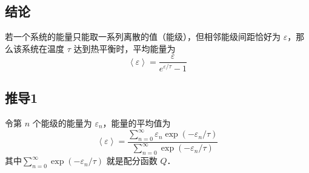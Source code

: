 

\subsection{结论}
若一个系统的能量只能取一系列离散的值（能级），但相邻能级间距恰好为 $\varepsilon$，那么该系统在温度 $\tau$ 达到热平衡时，平均能量为
\begin{equation}
\left\langle \varepsilon  \right\rangle  = \frac{\varepsilon }{{{e^{\varepsilon /\tau }} - 1}}
\end{equation}

\subsection{推导1}
令第 $n$ 个能级的能量为 ${\varepsilon _n}$，能量的平均值为
\begin{equation}\label{EqCE_eq2}
\left\langle \varepsilon  \right\rangle  = \frac{{\sum\limits_{n = 0}^\infty  {{\varepsilon _n}\exp \left( { - {\varepsilon _n}/\tau } \right)} }}{{\sum\limits_{n = 0}^\infty  {\exp \left( { - {\varepsilon _n}/\tau } \right)} }}
\end{equation}
其中$\sum\limits_{n = 0}^\infty  {\exp \left( { - {\varepsilon _n}/\tau } \right)}$ 就是配分函数 $Q$．

